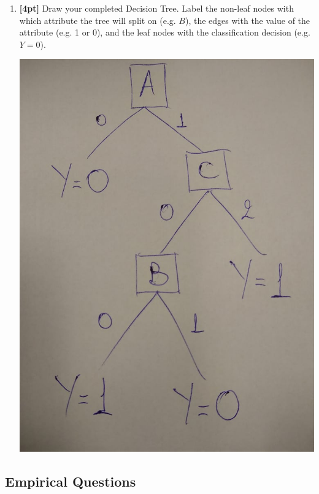 \documentclass[11pt]{article}
\numberwithin{equation}{section} %
\numberwithin{figure}{section} %
\numberwithin{table}{section} %
\begin{document}
\begin{enumerate}
    
\clearpage
    \item \textbf{[4pt]} Draw your completed Decision Tree. Label the non-leaf nodes with which attribute the tree will split on (e.g. $B$), the edges with the value of the attribute (e.g. 1 or 0), and the leaf nodes with the classification decision (e.g. $Y=0$).
    
    \begin{solution}
    \includegraphics[scale=0.5]{decTree}
  
    \end{solution}
    
\end{enumerate}

\clearpage
\subsection{Empirical Questions}
\label{sec:empirical}
\end{document}
